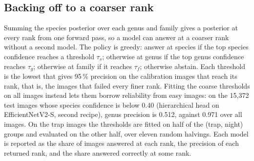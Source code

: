 \subsection{Backing off to a coarser rank}\label{sec:backoff}
Summing the species posterior over each genus and family gives a posterior at every rank from one forward pass, so a model can answer at a coarser rank without a second model.
The policy is greedy: answer at species if the top species confidence reaches a threshold $\tau_s$; otherwise at genus if the top genus confidence reaches $\tau_g$; otherwise at family if it reaches $\tau_f$; otherwise abstain.
Each threshold is the lowest that gives 95\,\% precision on the calibration images that reach its rank, that is, the images that failed every finer rank.
Fitting the coarse thresholds on all images instead lets them borrow reliability from easy images: on the 15,372 test images whose species confidence is below 0.40 (hierarchical head on EfficientNetV2-S, second recipe), genus precision is 0.512, against 0.971 over all images.
On the trap images the thresholds are fitted on half of the (trap, night) groups and evaluated on the other half, over eleven random halvings.
Each model is reported as the share of images answered at each rank, the precision of each returned rank, and the share answered correctly at some rank.
